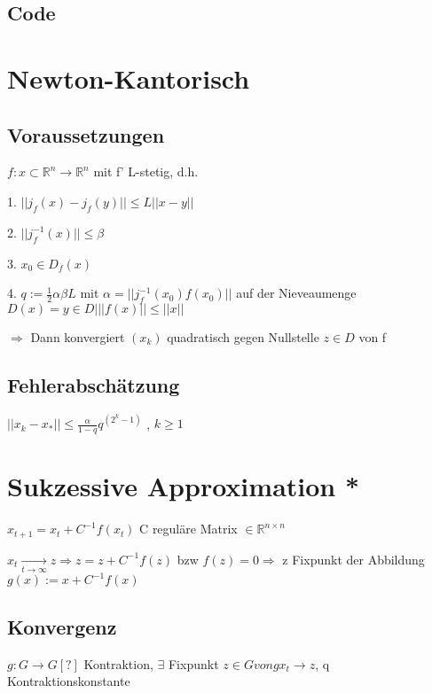 \documentclass[12pt,a4paper]{article} %
\newcommand*\tab[1][1cm]{\hspace*{#1}}
\begin{document}
	\subsection{Code}
	
	\newpage
	
	\section{Newton-Kantorisch}
	
	\subsection{Voraussetzungen}
	
	$f: x \subset \mathbb{R}^n \rightarrow \mathbb{R}^n$ mit f' L-stetig, d.h.
	
	1. $|| j_f(x) - j_f(y)|| \le L||x - y||$
	
	2. $||j_f^{-1}(x)|| \le \beta$
	
	3. $x_0 \in D_f(x)$
	
	4. $q := \frac{1}{2} \alpha \beta L$ mit $\alpha = ||j_f^{-1}(x_0)f(x_0)||$ auf der Nieveaumenge $D(x) = {y \in D | ||f(x) || \le ||x||}$
	
	$\Rightarrow$ Dann konvergiert $(x_k)$ quadratisch gegen Nullstelle $z \in D$ von f
	
	\subsection{Fehlerabschätzung}
	
	$||x_k - x_*|| \le \frac{\alpha}{1 - q}q^{(2^k - 1)}$ \tab , $k \ge 1$
	
	\newpage
	
	\section{Sukzessive Approximation *}
	
	$x_{t + 1} = x_t + C^{-1} f(x_t)$ \tab C reguläre Matrix $\in \mathbb{R}^{n \times n}$
	
	$x_t \xrightarrow[t \rightarrow \infty]{} z \Rightarrow z = z + C^{-1}f(z)$ bzw $f(z) = 0 \Rightarrow$ z Fixpunkt der Abbildung $g(x) := x + C^{-1}f(x)$
	
	\subsection{Konvergenz}
	
	$g: G \rightarrow G[?]$ Kontraktion, $\exists$ Fixpunkt $z \in G von g x_t \rightarrow z$, q Kontraktionskonstante
	
\end{document}
